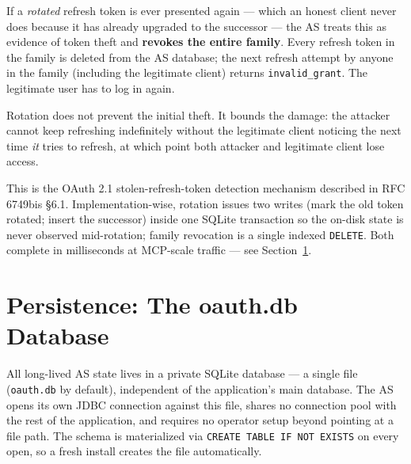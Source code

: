 If a \emph{rotated} refresh token is ever presented again --- which an honest client never does because it has already upgraded to the successor --- the AS treats this as evidence of token theft and \textbf{revokes the entire family}.  Every refresh token in the family is deleted from the AS database; the next refresh attempt by anyone in the family (including the legitimate client) returns \texttt{invalid\_grant}.  The legitimate user has to log in again.

\begin{notebox}
Rotation does not prevent the initial theft.  It bounds the damage: the attacker cannot keep refreshing indefinitely without the legitimate client noticing the next time \emph{it} tries to refresh, at which point both attacker and legitimate client lose access.
\end{notebox}

This is the OAuth 2.1 stolen-refresh-token detection mechanism described in RFC 6749bis \S{}6.1.  Implementation-wise, rotation issues two writes (mark the old token rotated; insert the successor) inside one SQLite transaction so the on-disk state is never observed mid-rotation; family revocation is a single indexed \texttt{DELETE}.  Both complete in milliseconds at MCP-scale traffic --- see Section~\ref{sec:as-persistence}.

\section{Persistence: The oauth.db Database}
\label{sec:as-persistence}

All long-lived AS state lives in a private SQLite database --- a single file (\texttt{oauth.db} by default), independent of the application's main database.  The AS opens its own JDBC connection against this file, shares no connection pool with the rest of the application, and requires no operator setup beyond pointing at a file path.  The schema is materialized via \texttt{CREATE TABLE IF NOT EXISTS} on every open, so a fresh install creates the file automatically.

